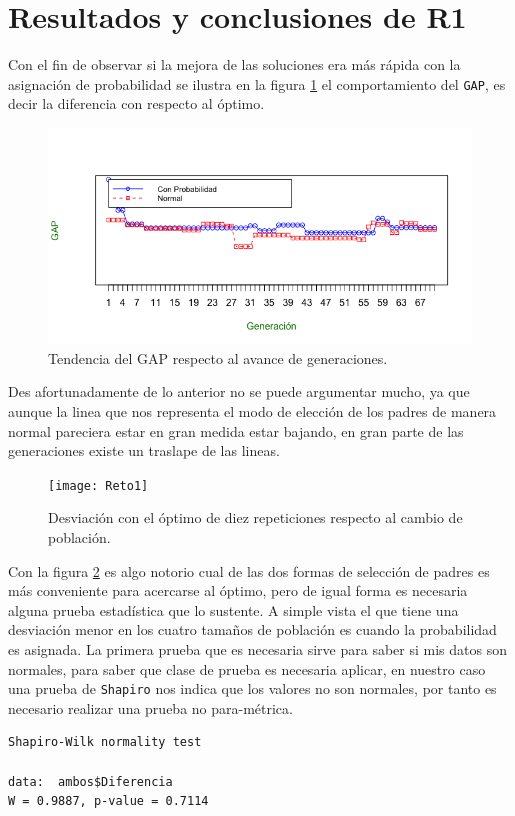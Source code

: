 \documentclass[a4paper]{article}
\begin{document}
\section{Resultados y conclusiones de R1}
Con el fin de observar si la mejora de las soluciones era más rápida con la asignación de probabilidad se ilustra en la figura \ref{fig:tendencia} el comportamiento del \texttt{GAP}, es decir la diferencia con respecto al óptimo.
\begin{figure}[h!]
\centering
\includegraphics[width=0.7\linewidth]{tendencia}
\caption{Tendencia del GAP respecto al avance de generaciones.}
\label{fig:tendencia}
\end{figure}

Des afortunadamente de lo anterior no se puede argumentar mucho, ya que aunque la linea que nos representa el modo de elección de los padres de manera normal pareciera estar en gran medida estar bajando, en gran parte de las generaciones existe un traslape de las lineas.

\begin{figure}[h!]
\centering
\texttt{[image: Reto1]}
\caption{Desviación con el óptimo de diez repeticiones respecto al cambio de población.}
\label{fig:Reto1}
\end{figure}

Con la figura \ref{fig:Reto1} es algo notorio cual de las dos formas de selección de padres es más conveniente para acercarse al óptimo, pero de igual forma es necesaria alguna prueba estadística que lo sustente. A simple vista el que tiene una desviación menor en los cuatro tamaños de población es cuando la probabilidad es asignada. La primera prueba que es necesaria sirve para saber si mis datos son normales, para saber que clase de prueba es necesaria aplicar, en nuestro caso una prueba de \texttt{Shapiro} nos indica que los valores no son normales, por tanto es necesario realizar una prueba no para-métrica.
\begin{lstlisting}[frame=single]
Shapiro-Wilk normality test

data:  ambos$Diferencia
W = 0.9887, p-value = 0.7114
\end{lstlisting}
\end{document}
